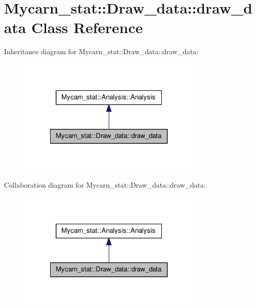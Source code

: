\hypertarget{classMycarn__stat_1_1Draw__data_1_1draw__data}{
\section{\-Mycarn\-\_\-stat\-:\-:\-Draw\-\_\-data\-:\-:draw\-\_\-data \-Class \-Reference}
\label{classMycarn__stat_1_1Draw__data_1_1draw__data}
}


\-Inheritance diagram for \-Mycarn\-\_\-stat\-:\-:\-Draw\-\_\-data\-:\-:draw\-\_\-data\-:
\nopagebreak
\begin{figure}[H]
\begin{center}
\leavevmode
\includegraphics[width=254pt]{classMycarn__stat_1_1Draw__data_1_1draw__data__inherit__graph}
\end{center}
\end{figure}


\-Collaboration diagram for \-Mycarn\-\_\-stat\-:\-:\-Draw\-\_\-data\-:\-:draw\-\_\-data\-:
\nopagebreak
\begin{figure}[H]
\begin{center}
\leavevmode
\includegraphics[width=254pt]{classMycarn__stat_1_1Draw__data_1_1draw__data__coll__graph}
\end{center}
\end{figure}
